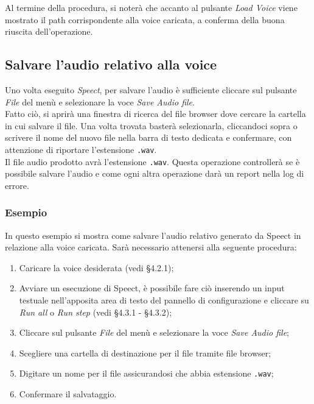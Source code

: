 \documentclass[openany,12pt,a4paper]{report}
\begin{document}
	\noindent Al termine della procedura, si noterà che accanto al pulsante \textit{Load Voice} viene mostrato il path corrispondente alla voice caricata, a conferma della buona riuscita dell'operazione.
	
	\subsection{Salvare l'audio relativo alla voice}
	Uno volta eseguito \textit{Speect}, per salvare l'audio è sufficiente cliccare sul pulsante \textit{File} del menù e selezionare la voce \textit{Save Audio file}.\\
	Fatto ciò, si aprirà una finestra di ricerca del file browser dove cercare la cartella in cui salvare il file. Una volta trovata basterà selezionarla, cliccandoci sopra o scrivere il nome del nuovo file nella barra di testo dedicata e confermare, con attenzione di riportare l'estensione \verb|.wav|.\\
	Il file audio prodotto avrà l'estensione \verb|.wav|.
	Questa operazione controllerà se è possibile salvare l'audio e come ogni altra operazione darà un report nella log di errore.
	
	\subsubsection*{Esempio}
	
	In questo esempio si mostra come salvare l'audio relativo generato da Speect in relazione alla voice caricata. Sarà necessario attenersi alla seguente procedura:
	
	\begin{enumerate}
		\item Caricare la voice desiderata (vedi §4.2.1);
		\item Avviare un esecuzione di Speect, è possibile fare ciò inserendo un input testuale nell'apposita area di testo del pannello di configurazione e cliccare su \textit{Run all} o \textit{Run step} (vedi §4.3.1 - §4.3.2);
		\item Cliccare sul pulsante \textit{File} del menù e selezionare la voce \textit{Save Audio file}; 
		\item Scegliere una cartella di destinazione per il file tramite file browser;
		\item Digitare un nome per il file assicurandosi che abbia estensione \verb|.wav|;
		\item Confermare il salvataggio.
	\end{enumerate} 
	
\end{document}
